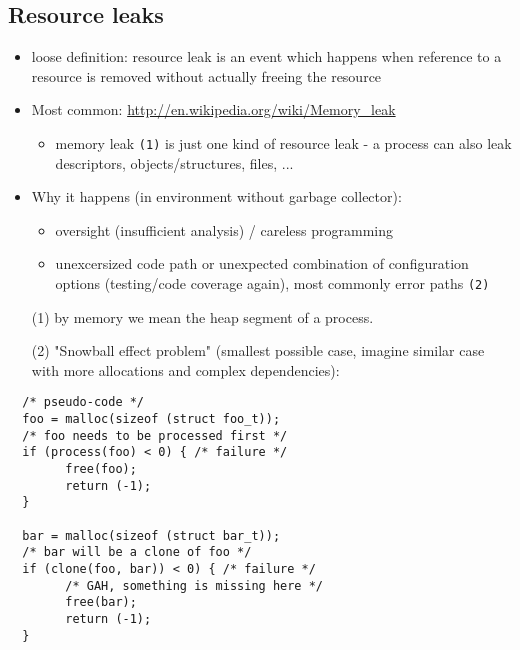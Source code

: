 \subsection{Resource leaks}

\begin{itemize}
\item loose definition: resource leak is an event which happens when
   reference to a resource is removed without actually freeing the
   resource
\item Most common: \url{http://en.wikipedia.org/wiki/Memory\_leak}
  \begin{itemize}
  \item memory leak \texttt{(1)} is just one kind of resource leak
     - a process can also leak descriptors, objects/structures, files, ...
  \end{itemize}
\item Why it happens (in environment without garbage collector):
  \begin{itemize}
  \item oversight (insufficient analysis) / careless programming
  \item unexcersized code path or unexpected combination of configuration 
     options (testing/code coverage again), most commonly error paths
     \texttt{(2)}
  \end{itemize}
\end{itemize}

\begin{itemize}
  \item[(1)] by memory we mean the heap segment of a process.
  \item[(2)] "Snowball effect problem" (smallest possible case, imagine
  similar case with more allocations and complex dependencies):
\end{itemize}

\begin{lstlisting}
  /* pseudo-code */
  foo = malloc(sizeof (struct foo_t));
  /* foo needs to be processed first */
  if (process(foo) < 0) { /* failure */
        free(foo);
        return (-1);
  }

  bar = malloc(sizeof (struct bar_t));
  /* bar will be a clone of foo */
  if (clone(foo, bar)) < 0) { /* failure */
        /* GAH, something is missing here */
        free(bar);
        return (-1);
  }
\end{lstlisting}

